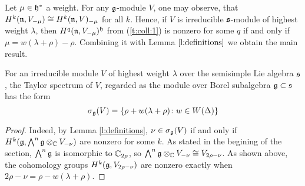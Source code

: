 Let $\mu \in \mathfrak{h}^*$ a weight. For any $\mathfrak{g}$-module $V$, one may observe, that $H^k(\mathfrak{n},
V_{-\mu}) \cong H^k(\mathfrak{n}, V)_{-\mu}$ for all $k$. Hence, if $V$ is irreducible $\mathfrak{s}$-module of
highest weight $\lambda$, then $H^q(\mathfrak{n}, V_{-\mu})^{\mathfrak{h}}$ from (\ref{t:coll:1}) is nonzero for
some $q$ if and only if $\mu = w(\lambda + \rho) - \rho$. Combining it with Lemma
$\ref{l:definitions}$ we obtain the main result.
\begin{theorem} \label{t:borelspectrum}
   For an irreducible module $V$ of highest weight $\lambda$ over the semisimple Lie algebra
   $\mathfrak{s}$, the Taylor spectrum of $V$, regarded as the module over Borel subalgebra $\mathfrak{g} \subset
   \mathfrak{s}$ has the form 
   \[
       \sigma_{\mathfrak{g}}(V) = \{ \rho + w(\lambda + \rho)\colon w \in W(\Delta)\}
   \]
\end{theorem}
\begin{proof}
    Indeed, by Lemma \ref{l:definitions}, $\nu \in \sigma_{\mathfrak{g}}(V)$ if and only if $H^k(\mathfrak{g},
    \bigwedge^n\mathfrak{g} \otimes_{\mathbb{C}} V_{-\nu})$ are nonzero for some $k$. As stated in the begining of
    the section, $\bigwedge^n \mathfrak{g}$ is isomorphic to $\mathbb{C}_{2\rho}$, so $\bigwedge^n\mathfrak{g}
    \otimes_{\mathbb{C}} V_{-\nu} \cong V_{2\rho - \nu}$. As shown above, the cohomology groups $H^k(\mathfrak{g},
    V_{2\rho - \nu})$ are nonzero exactly when $2\rho - \nu = \rho - w(\lambda + \rho)$.
\end{proof}
